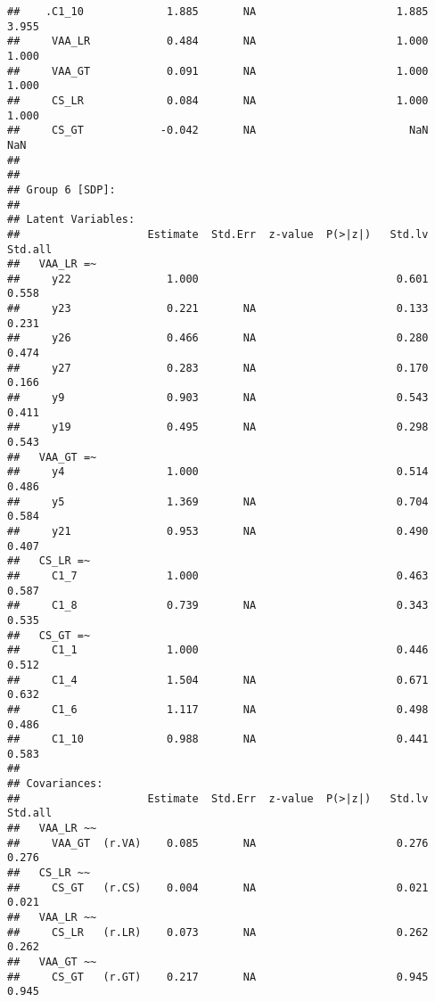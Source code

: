 \documentclass[
]{article}
\begin{document}
\begin{verbatim}
##    .C1_10             1.885       NA                      1.885    3.955
##     VAA_LR            0.484       NA                      1.000    1.000
##     VAA_GT            0.091       NA                      1.000    1.000
##     CS_LR             0.084       NA                      1.000    1.000
##     CS_GT            -0.042       NA                        NaN      NaN
## 
## 
## Group 6 [SDP]:
## 
## Latent Variables:
##                    Estimate  Std.Err  z-value  P(>|z|)   Std.lv  Std.all
##   VAA_LR =~                                                             
##     y22               1.000                               0.601    0.558
##     y23               0.221       NA                      0.133    0.231
##     y26               0.466       NA                      0.280    0.474
##     y27               0.283       NA                      0.170    0.166
##     y9                0.903       NA                      0.543    0.411
##     y19               0.495       NA                      0.298    0.543
##   VAA_GT =~                                                             
##     y4                1.000                               0.514    0.486
##     y5                1.369       NA                      0.704    0.584
##     y21               0.953       NA                      0.490    0.407
##   CS_LR =~                                                              
##     C1_7              1.000                               0.463    0.587
##     C1_8              0.739       NA                      0.343    0.535
##   CS_GT =~                                                              
##     C1_1              1.000                               0.446    0.512
##     C1_4              1.504       NA                      0.671    0.632
##     C1_6              1.117       NA                      0.498    0.486
##     C1_10             0.988       NA                      0.441    0.583
## 
## Covariances:
##                    Estimate  Std.Err  z-value  P(>|z|)   Std.lv  Std.all
##   VAA_LR ~~                                                             
##     VAA_GT  (r.VA)    0.085       NA                      0.276    0.276
##   CS_LR ~~                                                              
##     CS_GT   (r.CS)    0.004       NA                      0.021    0.021
##   VAA_LR ~~                                                             
##     CS_LR   (r.LR)    0.073       NA                      0.262    0.262
##   VAA_GT ~~                                                             
##     CS_GT   (r.GT)    0.217       NA                      0.945    0.945

\end{verbatim}
\end{document}
